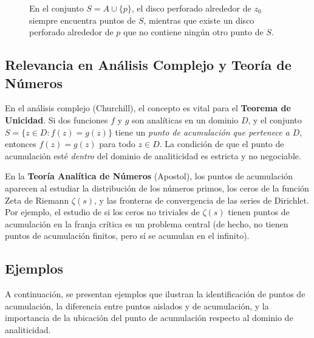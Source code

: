 \documentclass[a4paper]{article}
\begin{document}
\begin{figure}[H]
\caption{En el conjunto $S=A\cup\{p\}$, el disco perforado alrededor de $z_0$ siempre encuentra puntos de $S$, mientras que existe un disco perforado alrededor de $p$ que no contiene ningún otro punto de $S$.}
\end{figure}

\subsection*{Relevancia en Análisis Complejo y Teoría de Números}
En el análisis complejo (Churchill), el concepto es vital para el \textbf{Teorema de Unicidad}. Si dos funciones $f$ y $g$ son analíticas en un dominio $D$, y el conjunto $S = \{z \in D : f(z) = g(z)\}$ tiene un \textit{punto de acumulación que pertenece a $D$}, entonces $f(z) = g(z)$ para todo $z \in D$. La condición de que el punto de acumulación esté \textit{dentro} del dominio de analiticidad es estricta y no negociable.

En la \textbf{Teoría Analítica de Números} (Apostol), los puntos de acumulación aparecen al estudiar la distribución de los números primos, los ceros de la función Zeta de Riemann $\zeta(s)$, y las fronteras de convergencia de las series de Dirichlet. Por ejemplo, el estudio de si los ceros no triviales de $\zeta(s)$ tienen puntos de acumulación en la franja crítica es un problema central (de hecho, no tienen puntos de acumulación finitos, pero sí se acumulan en el infinito).

\subsection{Ejemplos}

A continuación, se presentan ejemplos que ilustran la identificación de puntos de acumulación, la diferencia entre puntos aislados y de acumulación, y la importancia de la ubicación del punto de acumulación respecto al dominio de analiticidad.
\end{document}

